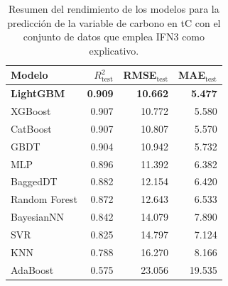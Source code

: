 \begin{table}
    \centering
    \caption{Resumen del rendimiento de los modelos para la predicción de la variable de carbono en tC con el conjunto de datos que emplea IFN3 como explicativo.}
    \label{tab:resultados_modelos_base_ifn3_tc}
    \begin{tabular}{lrrr}
        \toprule
        Modelo            & $R^2_{\text{test}}$ & RMSE$_{\text{test}}$ & MAE$_{\text{test}}$ \\
        \midrule
        \textbf{LightGBM} & \textbf{0.909}      & \textbf{10.662}      & \textbf{5.477}      \\
        XGBoost           & 0.907               & 10.772               & 5.580               \\
        CatBoost          & 0.907               & 10.807               & 5.570               \\
        GBDT              & 0.904               & 10.942               & 5.732               \\
        MLP               & 0.896               & 11.392               & 6.382               \\
        BaggedDT          & 0.882               & 12.154               & 6.420               \\
        Random Forest     & 0.872               & 12.643               & 6.533               \\
        BayesianNN        & 0.842               & 14.079               & 7.890               \\
        SVR               & 0.825               & 14.797               & 7.124               \\
        KNN               & 0.788               & 16.270               & 8.166               \\
        AdaBoost          & 0.575               & 23.056               & 19.535              \\
        \bottomrule
    \end{tabular}
\end{table}

